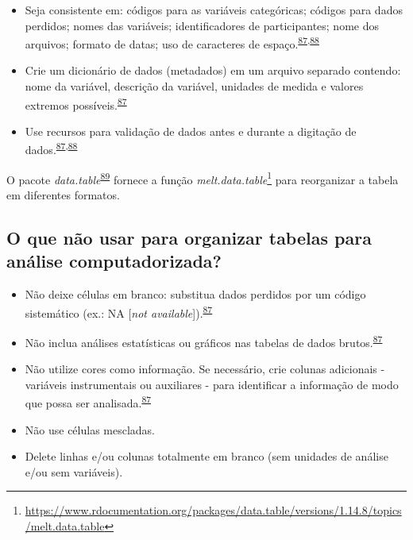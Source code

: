 \documentclass[
  a4paper,
]{book}
\renewcommand{\href}[2]{#2\footnote{\url{#1}}}
\newenvironment{infobox}[1]
  {
  \begin{itemize}
  \renewcommand{\labelitemi}{
    \raisebox{-.7\height}[0pt][0pt]{
      {\setkeys{Gin}{width=3em,keepaspectratio}
        \texttt{[image: \#1]}}
    }
  }
  \setlength{\fboxsep}{1em}
  \begin{blackbox}
  \item
  }
  {
  \end{blackbox}
  \end{itemize}
  }
\begin{document}
\begin{itemize}
\item
  Seja consistente em: códigos para as variáveis categóricas; códigos para dados perdidos; nomes das variáveis; identificadores de participantes; nome dos arquivos; formato de datas; uso de caracteres de espaço.\textsuperscript{\protect\hyperlink{ref-broman2018}{87},\protect\hyperlink{ref-Juluru2015}{88}}
\item
  Crie um dicionário de dados (metadados) em um arquivo separado contendo: nome da variável, descrição da variável, unidades de medida e valores extremos possíveis.\textsuperscript{\protect\hyperlink{ref-broman2018}{87}}
\item
  Use recursos para validação de dados antes e durante a digitação de dados.\textsuperscript{\protect\hyperlink{ref-broman2018}{87},\protect\hyperlink{ref-Juluru2015}{88}}
\end{itemize}

\begin{infobox}{images/Rlogo}
O pacote \emph{data.table}\textsuperscript{\protect\hyperlink{ref-data.table}{89}} fornece a função \href{https://www.rdocumentation.org/packages/data.table/versions/1.14.8/topics/melt.data.table}{\emph{melt.data.table}} para reorganizar a tabela em diferentes formatos.

\end{infobox}

\hypertarget{o-que-nuxe3o-usar-para-organizar-tabelas-para-anuxe1lise-computadorizada}{%
\subsection{O que não usar para organizar tabelas para análise computadorizada?}\label{o-que-nuxe3o-usar-para-organizar-tabelas-para-anuxe1lise-computadorizada}}

\begin{itemize}
\item
  Não deixe células em branco: substitua dados perdidos por um código sistemático (ex.: NA {[}\emph{not available}{]}).\textsuperscript{\protect\hyperlink{ref-broman2018}{87}}
\item
  Não inclua análises estatísticas ou gráficos nas tabelas de dados brutos.\textsuperscript{\protect\hyperlink{ref-broman2018}{87}}
\item
  Não utilize cores como informação. Se necessário, crie colunas adicionais - variáveis instrumentais ou auxiliares - para identificar a informação de modo que possa ser analisada.\textsuperscript{\protect\hyperlink{ref-broman2018}{87}}
\item
  Não use células mescladas.
\item
  Delete linhas e/ou colunas totalmente em branco (sem unidades de análise e/ou sem variáveis).
\end{itemize}
\end{document}
